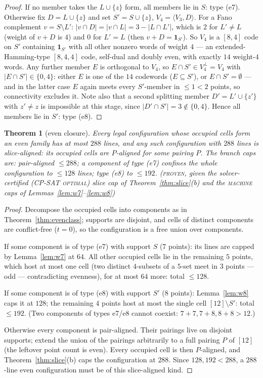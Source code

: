 \documentclass[11pt]{article}
\newtheorem{theorem}{Theorem}
\theoremstyle{remark}
\begin{document}
\begin{proof}
If no member takes the $L\cup\{z\}$ form, all members lie in $S$: type
(e7). Otherwise fix $D=L\cup\{z\}$ and set $S'=S\cup\{z\}$,
$V_4=\langle V_3,D\rangle$. For a Fano complement $v=S\setminus L'$:
$|v\cap D|=|v\cap L|=3-|L\cap L'|$, which is $2$ for $L'\ne L$ (weight of
$v+D$ is $4$) and $0$ for $L'=L$ (then $v+D=\mathbf 1_{S'}$). So $V_4$ is
a $[8,4]$ code on $S'$ containing $\mathbf 1_{S'}$ with all other nonzero
words of weight $4$ --- an extended-Hamming-type $[8,4,4]$ code, self-dual
and doubly even, with exactly $14$ weight-$4$ words. Any further member
$E$ is orthogonal to $V_4$, so $E\cap S'\in V_4^{\perp}=V_4$ with
$|E\cap S'|\in\{0,4\}$: either $E$ is one of the $14$ codewords
($E\subseteq S'$), or $E\cap S'=\emptyset$ --- and in the latter case $E$
again meets every $S'$-member in $\le1<2$ points, so connectivity excludes
it. Note also that a second splitting member $D'=L'\cup\{z'\}$ with
$z'\ne z$ is impossible at this stage, since $|D'\cap S'|=3\notin\{0,4\}$.
Hence all members lie in $S'$: type (e8).
\end{proof}

\begin{theorem}[even closure]\label{thm:evenclosure}
Every legal configuration whose occupied cells form an even family has at
most $288$ lines, and any such configuration with $288$ lines is
slice-aligned: its occupied cells are $P$-aligned for some pairing $P$.
The branch caps are: pair-aligned $\le288$; a component of type (e7)
confines the whole configuration to $\le 128$ lines; type (e8) to
$\le192$. \textsc{(proven}, given the solver-certified (CP-SAT
\textsc{optimal}) slice cap of
Theorem~\ref{thm:slice}(b) and the \textsc{machine} caps of
Lemmas~\ref{lem:w7}--\ref{lem:w8}\textsc{)}
\end{theorem}

\begin{proof}
Decompose the occupied cells into components as in
Theorem~\ref{thm:evenclass}; supports are disjoint, and cells of distinct
components are conflict-free ($t=0$), so the configuration is a free union
over components.

If some component is of type (e7) with support $S$ ($7$ points): its lines
are capped by Lemma~\ref{lem:w7} at $64$. All other occupied cells lie in
the remaining $5$ points, which host at most one cell (two distinct
$4$-subsets of a $5$-set meet in $3$ points --- odd --- contradicting
evenness), for at most $64$ more: total $\le 128$.

If some component is of type (e8) with support $S'$ ($8$ points):
Lemma~\ref{lem:w8} caps it at $128$; the remaining $4$ points host at most
the single cell $[12]\setminus S'$: total $\le 192$. (Two components of
types e7/e8 cannot coexist: $7+7,7+8,8+8>12$.)

Otherwise every component is pair-aligned. Their pairings live on disjoint
supports; extend the union of the pairings arbitrarily to a full pairing
$P$ of $[12]$ (the leftover point count is even). Every occupied cell is
then $P$-aligned, and Theorem~\ref{thm:slice}(b) caps the configuration at
$288$. Since $128,192<288$, a $288$-line even configuration must be of
this slice-aligned kind.
\end{proof}
\end{document}
